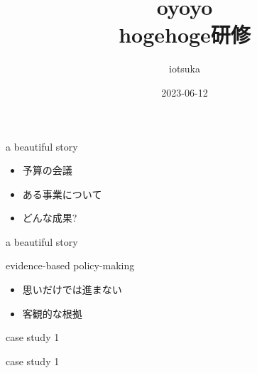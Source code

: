 \documentclass[
  ignorenonframetext,
]{beamer}
\title{oyoyo\\
hogehoge研修}
\author{iotsuka}
\date{2023-06-12}
\begin{document}
\frame{\titlepage}

\begin{frame}{a beautiful story}
\protect\hypertarget{a-beautiful-story}{}
\Huge

\begin{itemize}
\item[\textbullet] 予算の会議\pause
\item[\textbullet] ある事業について\pause
\item[\textbullet] どんな成果?
\end{itemize}
\end{frame}

\begin{frame}{a beautiful story}
\protect\hypertarget{a-beautiful-story-1}{}
\end{frame}

\begin{frame}{evidence-based policy-making}
\protect\hypertarget{evidence-based-policy-making}{}
\Huge

\begin{itemize}
\item[\textbullet] 思いだけでは進まない
\pause
\item[\textbullet] 客観的な根拠
\end{itemize}
\pause
\vspace*{-30pt}
\hspace*{18pt}
\end{frame}

\begin{frame}{case study 1}
\protect\hypertarget{case-study-1}{}
\end{frame}

\begin{frame}{case study 1}
\protect\hypertarget{case-study-1-1}{}
\Huge


\vspace*{-48pt}
\pause
{}
\end{frame}
\end{document}
